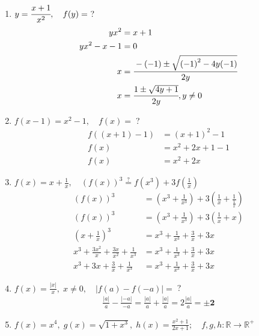 \documentclass{../sftex/sftex}
\begin{document}
\begin{enumerate}\bfseries
    \item $y = \cfrac{x+1}{x^2}, \quad f(y) = \; $?
        \begin{align*}
            yx^2 &= x + 1 \\
            yx^2 - x - 1 &= 0 \\
            x &= \cfrac{-(-1) \pm \sqrt{{(-1)}^2 - 4y(-1)}}{2y} \\
            x &= \cfrac{1 \pm \sqrt{4y + 1}}{2y}, y \neq 0
        \end{align*}

    \item $f(x-1) = x^2 - 1, \quad f(x) = \; $?
        \begin{align*}
            f((x + 1) - 1) &= {(x + 1)}^2 - 1 \\
            f(x) &= x^2 + 2x + 1 - 1 \\
            f(x) &= x^2 + 2x
        \end{align*}

    \item $f(x) = x + \frac{1}{x}, \quad
        {(f(x))}^3 \stackrel{?}{=} f(x^3) + 3f(\frac{1}{x})$ \\
        \begin{align*}
            {(f(x))}^3 &= (x^3 + \frac{1}{x^3}) + 3({\frac{1}{x}}
                + \frac{1}{\frac{1}{x}}) \\
            {(f(x))}^3
                &= (x^3 + \frac{1}{x^3}) + 3(\frac{1}{x} + x) \\
            {(x + \frac{1}{x})}^3
                &= x^3 + \frac{1}{x^3} + {\frac{3}{x} + 3x} \\
            x^3 + \frac{3x^2}{x} + \frac{3x}{x^2} + \frac{1}{x^3}
                &= x^3 + \frac{1}{x^3} + {\frac{3}{x} + 3x} \\
            x^3 + 3x + \frac{3}{x} + \frac{1}{x^3}
                &= x^3 + \frac{1}{x^3} + {\frac{3}{x}} + 3x
        \end{align*}

    \item $f(x) = \frac{|x|}{x}, \; x \neq 0, \quad |f(a) - f(-a)| = \; $?
        \begin{align*}
            \frac{|a|}{a} - \frac{|-a|}{-a} =
            \frac{|a|}{a} + \frac{|a|}{a} = 2\frac{|a|}{a} = \mathbf{\pm2}
        \end{align*}

    \item $f(x) = x^4, \;
        g(x) = \sqrt{1+x^3}, \;
        h(x) = \frac{x^2 + 1}{2x + 1}; \quad
        f,g,h : \mathbb{R} \rightarrow \mathbb{R}^{+}$


\end{enumerate}
\end{document}
